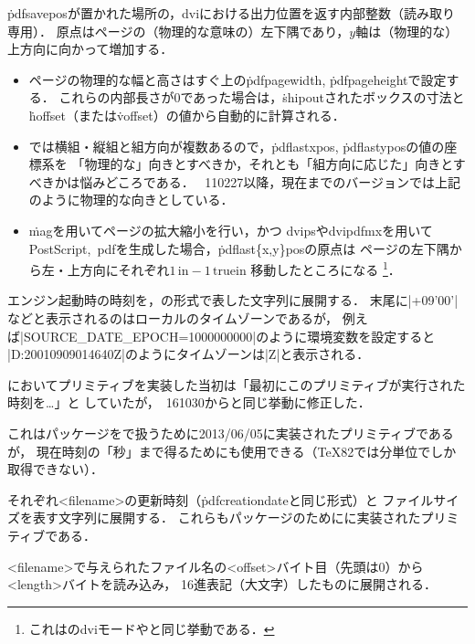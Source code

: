 \documentclass[a4paper,11pt,nomag]{jsarticle}
\begin{document}
\begin{cslist}
  \.{pdfsavepos}が置かれた場所の，dviにおける出力位置を返す内部整数（読み取り専用）．
  原点はページの（物理的な意味の）左下隅であり，$y$軸は（物理的な）上方向に向かって増加する．
 \begin{itemize}
  \item ページの物理的な幅と高さはすぐ上の\.{pdfpagewidth}, \.{pdfpageheight}で設定する．
    これらの内部長さが0であった場合は，\.{shipout}されたボックスの寸法と
    \.{hoffset}（または\.{voffset}）の値から自動的に計算される．
  \item \pTeX では横組・縦組と組方向が複数あるので，\.{pdflastxpos}, \.{pdflastypos}の値の座標系を
    「物理的な」向きとすべきか，それとも「組方向に応じた」向きとすべきかは悩みどころである．
    \epTeX~110227以降，現在までのバージョンでは上記のように物理的な向きとしている．
  \item \.{mag}を用いてページの拡大縮小を行い，かつ
    dvipsやdvipdfmxを用いてPostScript,~pdfを生成した場合，\.{pdflast\{x,y\}pos}の原点は
    ページの左下隅から左・上方向にそれぞれ$1\,\mathrm{in}-1\,\mathrm{truein}$%
    移動したところになる
    \footnote{これはのdviモードやと同じ挙動である．}．
 \end{itemize}
  
 \csitem[\.{pdfcreationdate}]
  エンジン起動時の時刻を，\texttt{\pdfcreationdate}の形式で表した文字列に展開する．
  末尾に|+09'00'|などと表示されるのはローカルのタイムゾーンであるが，
  例えば|SOURCE_DATE_EPOCH=1000000000|のように環境変数を設定すると
  |D:20010909014640Z|のようにタイムゾーンは|Z|と表示される．

  \epTeX においてプリミティブを実装した当初は「最初にこのプリミティブが実行された時刻を…」と
  していたが，\epTeX~161030からと同じ挙動に修正した．

  これはパッケージを\epTeX で扱うために2013/06/05に実装されたプリミティブであるが，
  現在時刻の「秒」まで得るためにも使用できる（\TeX 82では分単位でしか取得できない）．

  それぞれ<filename>の更新時刻（\.{pdfcreationdate}と同じ形式）と
  ファイルサイズを表す文字列に展開する．
  これらもパッケージのために\epTeX に実装されたプリミティブである．
  
  <filename>で与えられたファイル名の<offset>バイト目（先頭は0）から<length>バイトを読み込み，
  16進表記（大文字）したものに展開される．
  

\end{cslist}
\end{document}
